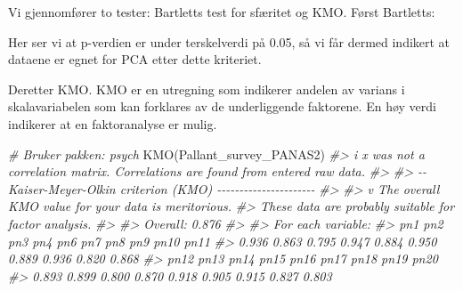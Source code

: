 \documentclass[
]{article}
\newenvironment{Shaded}{\begin{snugshade}}{\end{snugshade}}
\newcommand{\AttributeTok}[1]{\textcolor[rgb]{0.77,0.63,0.00}{#1}}
\newcommand{\CommentTok}[1]{\textcolor[rgb]{0.56,0.35,0.01}{\textit{#1}}}
\newcommand{\FunctionTok}[1]{\textcolor[rgb]{0.00,0.00,0.00}{#1}}
\newcommand{\NormalTok}[1]{#1}
\newcommand{\OtherTok}[1]{\textcolor[rgb]{0.56,0.35,0.01}{#1}}
\begin{document}
Vi gjennomfører to tester: Bartletts test for sfæritet og KMO. Først Bartletts:

\begin{Shaded}
\end{Shaded}

Her ser vi at p-verdien er under terskelverdi på 0.05, så vi får dermed indikert at dataene er egnet for PCA etter dette kriteriet.

Deretter KMO. KMO er en utregning som indikerer andelen av varians i skalavariabelen som kan forklares av de underliggende faktorene. En høy verdi indikerer at en faktoranalyse er mulig.

\begin{Shaded}
\begin{Highlighting}[]
\CommentTok{\# Bruker pakken: psych}
\FunctionTok{KMO}\NormalTok{(Pallant\_survey\_PANAS2)}
\CommentTok{\#\textgreater{} i \textquotesingle{}x\textquotesingle{} was not a correlation matrix. Correlations are found from entered raw data.}
\CommentTok{\#\textgreater{} }
\CommentTok{\#\textgreater{} {-}{-} Kaiser{-}Meyer{-}Olkin criterion (KMO) {-}{-}{-}{-}{-}{-}{-}{-}{-}{-}{-}{-}{-}{-}{-}{-}{-}{-}{-}{-}{-}{-}}
\CommentTok{\#\textgreater{} }
\CommentTok{\#\textgreater{} v The overall KMO value for your data is meritorious.}
\CommentTok{\#\textgreater{}   These data are probably suitable for factor analysis.}
\CommentTok{\#\textgreater{} }
\CommentTok{\#\textgreater{}   Overall: 0.876}
\CommentTok{\#\textgreater{} }
\CommentTok{\#\textgreater{}   For each variable:}
\CommentTok{\#\textgreater{}   pn1   pn2   pn3   pn4   pn6   pn7   pn8   pn9  pn10  pn11 }
\CommentTok{\#\textgreater{} 0.936 0.863 0.795 0.947 0.884 0.950 0.889 0.936 0.820 0.868 }
\CommentTok{\#\textgreater{}  pn12  pn13  pn14  pn15  pn16  pn17  pn18  pn19  pn20 }
\CommentTok{\#\textgreater{} 0.893 0.899 0.800 0.870 0.918 0.905 0.915 0.827 0.803}
\end{Highlighting}
\end{Shaded}
\end{document}
